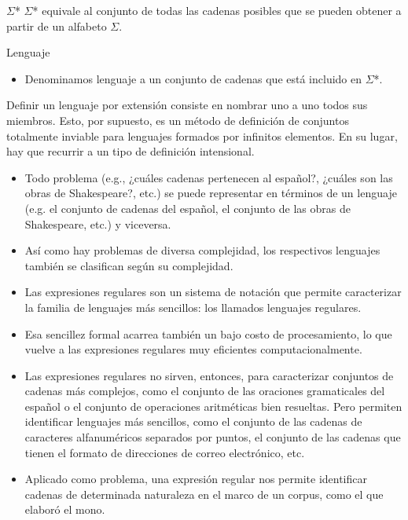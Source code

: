 \documentclass{beamer}
\begin{document}
\begin{frame}{$\Sigma$*}
$\Sigma$* equivale al conjunto de todas las cadenas posibles que se pueden obtener a partir de un alfabeto $\Sigma$.
\end{frame}

\begin{frame}{Lenguaje}

\begin{itemize}
\item Denominamos lenguaje a un conjunto de cadenas que está incluido en $\Sigma$*.
\end{itemize}

\end{frame}

\begin{frame}
Definir un lenguaje por extensión consiste en nombrar uno a uno todos sus miembros. Esto, por supuesto, es un método de definición de conjuntos totalmente inviable para lenguajes formados por infinitos elementos. En su lugar, hay que recurrir a un tipo de definición intensional.
\end{frame}


\begin{frame}
\begin{itemize}
\item Todo problema (e.g., ¿cuáles cadenas pertenecen al español?, ¿cuáles son las obras de Shakespeare?, etc.) se puede representar en términos de un lenguaje (e.g. el conjunto de cadenas del español, el conjunto de las obras de Shakespeare, etc.) y viceversa.
\item Así como hay problemas de diversa complejidad, los respectivos lenguajes también se clasifican según su complejidad. 
\end{itemize}
\end{frame}

\begin{frame}
\begin{itemize}
\item Las expresiones regulares son un sistema de notación que permite caracterizar la familia de lenguajes más sencillos: los llamados lenguajes regulares. \pause
\item Esa sencillez formal acarrea también un bajo costo de procesamiento, lo que vuelve a las expresiones regulares muy eficientes computacionalmente. \pause
\item Las expresiones regulares no sirven, entonces, para caracterizar conjuntos de cadenas más complejos, como el conjunto de las oraciones gramaticales del español o el conjunto de operaciones aritméticas bien resueltas. Pero permiten identificar lenguajes más sencillos, como el conjunto de las cadenas de caracteres alfanuméricos separados por puntos, el conjunto de las cadenas que tienen el formato de direcciones de correo electrónico, etc. \pause
\item Aplicado como problema, una expresión regular nos permite identificar cadenas de determinada naturaleza en el marco de un corpus, como el que elaboró el mono.
\end{itemize}
\end{frame}
\end{document}
